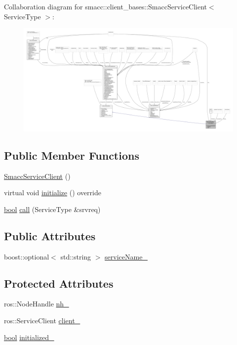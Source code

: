 Collaboration diagram for smacc\+:\+:client\+\_\+bases\+:\+:Smacc\+Service\+Client$<$ Service\+Type $>$\+:
\nopagebreak
\begin{figure}[H]
\begin{center}
\leavevmode
\includegraphics[width=350pt]{classsmacc_1_1client__bases_1_1SmaccServiceClient__coll__graph}
\end{center}
\end{figure}
\subsection*{Public Member Functions}
\begin{DoxyCompactItemize}
\item 
\hyperlink{classsmacc_1_1client__bases_1_1SmaccServiceClient_ab041a903fa40cb5df251f0cd437604cc}{Smacc\+Service\+Client} ()
\item 
virtual void \hyperlink{classsmacc_1_1client__bases_1_1SmaccServiceClient_aa51b80828e4ab19627210440ae15b6f3}{initialize} () override
\item 
\hyperlink{classbool}{bool} \hyperlink{classsmacc_1_1client__bases_1_1SmaccServiceClient_a0e9914f45f1091c38bb9ad6187d07977}{call} (Service\+Type \&srvreq)
\end{DoxyCompactItemize}
\subsection*{Public Attributes}
\begin{DoxyCompactItemize}
\item 
boost\+::optional$<$ std\+::string $>$ \hyperlink{classsmacc_1_1client__bases_1_1SmaccServiceClient_a63732ec406cb8b6f65bbdbb73e01c7ab}{service\+Name\+\_\+}
\end{DoxyCompactItemize}
\subsection*{Protected Attributes}
\begin{DoxyCompactItemize}
\item 
ros\+::\+Node\+Handle \hyperlink{classsmacc_1_1client__bases_1_1SmaccServiceClient_afb62982383b8269c7962cd1588537489}{nh\+\_\+}
\item 
ros\+::\+Service\+Client \hyperlink{classsmacc_1_1client__bases_1_1SmaccServiceClient_a632093eb6bc8b058dec492b21c8536f9}{client\+\_\+}
\item 
\hyperlink{classbool}{bool} \hyperlink{classsmacc_1_1client__bases_1_1SmaccServiceClient_ad36816c62fc14380a6d0782a2592a5b4}{initialized\+\_\+}
\end{DoxyCompactItemize}


